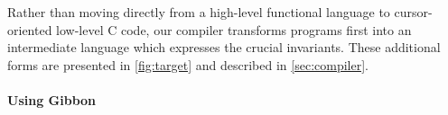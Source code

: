 \documentclass[a4paper,english]{lipics-v2016}
\newcommand{\treelang}{Gibbon\xspace} %
\begin{document}
Rather than moving directly from a high-level functional language to
cursor-oriented low-level C code, our compiler transforms programs
first into an intermediate language which expresses the crucial
invariants.  These additional forms are presented in \cref{fig:target}
and described in \cref{sec:compiler}.














\paragraph*{Using Gibbon}
\end{document}
